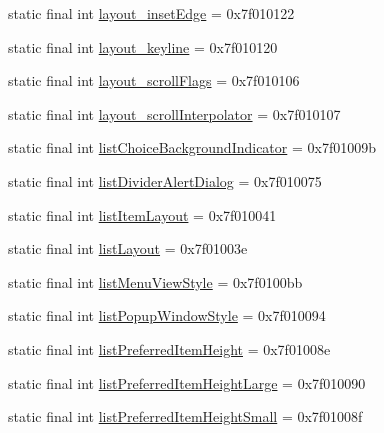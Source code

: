 \begin{CompactItemize}
\item 
static final int \hyperlink{classandroid_1_1support_1_1v7_1_1palette_1_1_r_1_1attr_d9005fdc66c379541013482654bc5927}{layout\_\-insetEdge} = 0x7f010122
\item 
static final int \hyperlink{classandroid_1_1support_1_1v7_1_1palette_1_1_r_1_1attr_885bdb043f76c37c00482624670f7390}{layout\_\-keyline} = 0x7f010120
\item 
static final int \hyperlink{classandroid_1_1support_1_1v7_1_1palette_1_1_r_1_1attr_324be21a79ec9ef67ae84fecef765b63}{layout\_\-scrollFlags} = 0x7f010106
\item 
static final int \hyperlink{classandroid_1_1support_1_1v7_1_1palette_1_1_r_1_1attr_7eba625ad35d3465fb62732bf306094b}{layout\_\-scrollInterpolator} = 0x7f010107
\item 
static final int \hyperlink{classandroid_1_1support_1_1v7_1_1palette_1_1_r_1_1attr_920f2dd4c3b33062d8f7faa090806f9f}{listChoiceBackgroundIndicator} = 0x7f01009b
\item 
static final int \hyperlink{classandroid_1_1support_1_1v7_1_1palette_1_1_r_1_1attr_2dff2357662e9538fd2b478dae3de9e0}{listDividerAlertDialog} = 0x7f010075
\item 
static final int \hyperlink{classandroid_1_1support_1_1v7_1_1palette_1_1_r_1_1attr_9e18ac48a4c5a8ad40e3210ef96b2838}{listItemLayout} = 0x7f010041
\item 
static final int \hyperlink{classandroid_1_1support_1_1v7_1_1palette_1_1_r_1_1attr_c5258e91ba62b066b8e68f766cbf08c2}{listLayout} = 0x7f01003e
\item 
static final int \hyperlink{classandroid_1_1support_1_1v7_1_1palette_1_1_r_1_1attr_5a8c580ca2cce0ce17a1c5df9c6ba662}{listMenuViewStyle} = 0x7f0100bb
\item 
static final int \hyperlink{classandroid_1_1support_1_1v7_1_1palette_1_1_r_1_1attr_b2daa9a4f5ca36b05faeda2be2c66641}{listPopupWindowStyle} = 0x7f010094
\item 
static final int \hyperlink{classandroid_1_1support_1_1v7_1_1palette_1_1_r_1_1attr_efb12d945093ed3188715f7e5f9ae16a}{listPreferredItemHeight} = 0x7f01008e
\item 
static final int \hyperlink{classandroid_1_1support_1_1v7_1_1palette_1_1_r_1_1attr_f962a0d3bb71796fe00394d06206e8f7}{listPreferredItemHeightLarge} = 0x7f010090
\item 
static final int \hyperlink{classandroid_1_1support_1_1v7_1_1palette_1_1_r_1_1attr_7c56c9c2bf7fc6b4a9e3c9417825ce10}{listPreferredItemHeightSmall} = 0x7f01008f

\end{CompactItemize}
